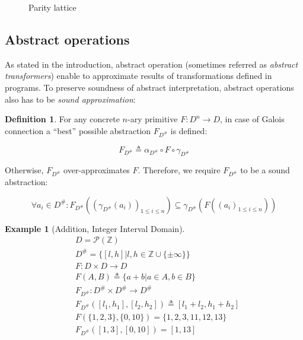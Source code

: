 \documentclass[12pt,oneside]{fithesis2}
\theoremstyle{definition}
\newtheorem{exmp}{Example}[section]
\newtheorem{definition}{Definition}
\begin{document}
\begin{figure}[ht!]
  \centering
  \caption{Parity lattice}
\end{figure}

\subsection{Abstract operations}\label{sec:operations}

As stated in the introduction, abstract operation (sometimes referred as \textit{abstract transformers}) enable to approximate results of transformations defined in programs. To preserve soundness of abstract interpretation, abstract operations also has to be \textit{sound approximation}:

\begin{definition}
For any concrete $n$-ary primitive $F: D^n \to D$, in case of Galois connection a ``best'' possible abstraction $F_{D^\#}$ is defined: \cite{mine-AIAA10}

\[
  F_{D^\#} \triangleq \alpha_{D^\#} \circ F \circ \gamma_{D^\#}
\]

Otherwise, $F_{D^\#}$ over-approximates $F$. Therefore, we require $F_{D^\#}$ to be a sound abstraction: \cite{CousotEtAl06-ASIAN}

\[
\forall a_i \in D^\#: F_{D^\#}((\gamma_{D^\#}(a_i))_{1 \le i \le n}) \subseteq \gamma_{D^\#}(F((a_i)_{1 \le i \le n}))
\]

\end{definition}

\begin{exmp}[Addition, Integer Interval Domain\cite{mine-WING12}]
  \begin{align*}
    &D = \mathcal P(\mathbb Z)\\
    &D^\# = \{[l,h] | l,h \in \mathbb{Z} \cup \{\pm\infty\}\}\\
    &F: D \times D \to D\\
    &F(A,B) \triangleq \{a+b | a \in A, b \in B \}\\
    &F_{D^\#}: D^\# \times D^\# \to D^\#\\
    &F_{D^\#}([l_1, h_1], [l_2, h_2]) \triangleq [l_1 + l_2, h_1 + h_2]\\
    &F(\{1,2,3\}, \{0,10\}) = \{1,2,3,11,12,13\}\\
    &F_{D^\#}([1,3], [0,10]) = [1,13]
  \end{align*}
\end{exmp}
\end{document}
